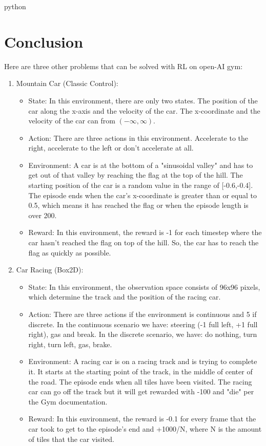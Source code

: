 \documentclass{article}
\numberwithin{equation}{section}
\numberwithin{equation}{section}
\begin{document}
\begin{enumarte}
\begin{mintedbox}{python}
\section*{Conclusion}
Here are three other problems that can be solved with RL on open-AI gym:

\begin{enumerate}
\item Mountain Car (Classic Control):
\begin{itemize}
\item State: In this environment, there are only two states. The position of the car along the x-axis and the velocity of the car. The x-coordinate and the velocity of the car can from $\left(-\infty, \infty\right)$.
\item Action: There are three actions in this environment. Accelerate to the right, accelerate to the left or don't accelerate at all.  
\item Environment: A car is at the bottom of a "sinusoidal valley" and has to get out of that valley by reaching the flag at the top of the hill. The starting position of the car is a random value in the range of [-0.6,-0.4]. The episode ends when the car's x-coordinate is greater than or equal to 0.5, which means it has reached the flag or when the episode length is over 200.
\item Reward: In this environment, the reward is -1 for each timestep where the car hasn't reached the flag on top of the hill. So, the car has to reach the flag as quickly as possible.  
\end{itemize}



\item Car Racing (Box2D): 
\begin{itemize}
\item State: In this environment, the observation space consists of 96x96 pixels, which determine the track and the position of the racing car.
\item Action: There are three actions if the environment is continuous and 5 if discrete. In the continuous scenario we have: steering (-1 full left, +1 full right), gas and break. In the discrete scenario, we have: do nothing, turn right, turn left, gas, brake.
\item Environment: A racing car is on a racing track and is trying to complete it. It starts at the starting point of the track, in the middle of center of the road. The episode ends when all tiles have been visited. The racing car can go off the track but it will get rewarded with -100 and "die" per the Gym documentation.
\item Reward: In this environment, the reward is -0.1 for every frame that the car took to get to the episode's end and +1000/N, where N is the amount of tiles that the car visited.
\end{itemize}










\end{enumerate}
\end{mintedbox}
\end{enumarte}
\end{document}

